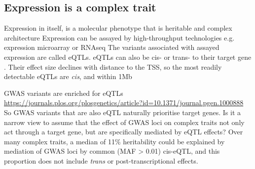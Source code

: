 \begin{outline}
\subsection{Expression is a complex trait}

\1 Expression in itself, is a molecular phenotype that is heritable and complex architecture \autocite{gaffney2013GlobalPropertiesFunctional}
    \2 Expression can be assayed by high-throughput technologies e.g. expression microarray or \gls{RNAseq} 
    \2 The variants associated with assayed expression are called \glspl{eQTL}.
    \2 eQTLs can also be cis- or trans- to their target gene \autocite{albert2015RoleRegulatoryVariation}.
    \2 Their effect size declines with distance to the TSS, so the most readily detectable eQTLs are \textit{cis}, and within 1Mb \autocite{vandiedonck2017GeneticAssociationMolecular}

\1 GWAS variants are enriched for eQTLs \url{https://journals.plos.org/plosgenetics/article?id=10.1371/journal.pgen.1000888}
    \2 So GWAS variants that are also eQTL naturally prioritise target genes.
    \2 Is it a narrow view to assume that the effect of GWAS loci on complex traits not only act through a target gene, but are specifically mediated by eQTL effects?
        \3 Over many complex traits, a median of 11\% heritability could be explained by mediation of GWAS loci by common (MAF > 0.01) cis-eQTL, 
        and this proportion does not include \textit{trans} or post-transcriptional effects.


\end{outline}
